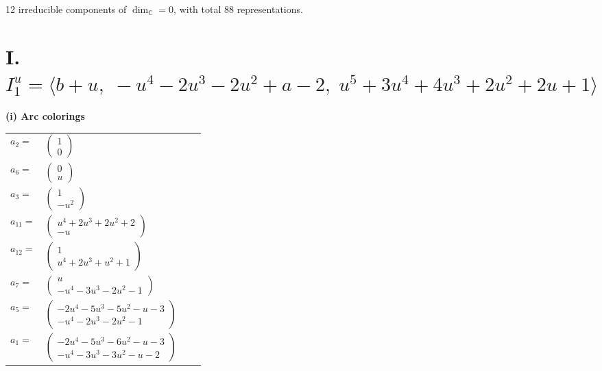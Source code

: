 \documentclass[1p]{elsarticle_modified}
\theoremstyle{definition}
\begin{document}
\raggedright * 12 irreducible components of $\dim_{\mathbb{C}}=0$, with total 88 representations.\\
\newpage
\renewcommand{\arraystretch}{1}
\centering \section*{I. $I^u_{1}= \langle b+u,\;- u^4-2 u^3-2 u^2+a-2,\;u^5+3 u^4+4 u^3+2 u^2+2 u+1 \rangle$}
\flushleft \textbf{(i) Arc colorings}\\
\begin{tabular}{m{7pt} m{180pt} m{7pt} m{180pt} }
\flushright $a_{2}=$&$\begin{pmatrix}1\\0\end{pmatrix}$ \\
\flushright $a_{6}=$&$\begin{pmatrix}0\\u\end{pmatrix}$ \\
\flushright $a_{3}=$&$\begin{pmatrix}1\\- u^2\end{pmatrix}$ \\
\flushright $a_{11}=$&$\begin{pmatrix}u^4+2 u^3+2 u^2+2\\- u\end{pmatrix}$ \\
\flushright $a_{12}=$&$\begin{pmatrix}1\\u^4+2 u^3+u^2+1\end{pmatrix}$ \\
\flushright $a_{7}=$&$\begin{pmatrix}u\\- u^4-3 u^3-2 u^2-1\end{pmatrix}$ \\
\flushright $a_{5}=$&$\begin{pmatrix}-2 u^4-5 u^3-5 u^2- u-3\\- u^4-2 u^3-2 u^2-1\end{pmatrix}$ \\
\flushright $a_{1}=$&$\begin{pmatrix}-2 u^4-5 u^3-6 u^2- u-3\\- u^4-3 u^3-3 u^2- u-2\end{pmatrix}$ \\

\end{tabular}
\end{document}
